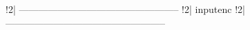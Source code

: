 !2| --------------------------------------------------
!2| {inputenc}
!2| --------------------------------------------------

\usepackage[utf8]{inputenc}
